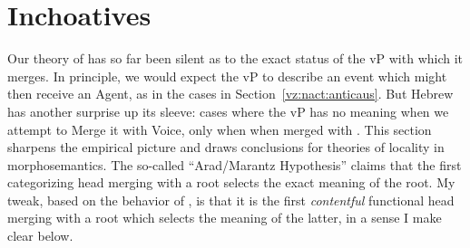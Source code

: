{%
%


\section{Inchoatives} \label{vz:inch}
Our theory of {\vz} has so far been silent as to the exact status of the vP with which it merges. In principle, we would expect the vP to describe an event which might then receive an Agent, as in the cases in Section~\ref{vz:nact:anticaus}. But Hebrew has another surprise up its sleeve: cases where the vP has no meaning when we attempt to Merge it with Voice, only when when merged with {\vz}. This section sharpens the empirical picture and draws conclusions for theories of locality in morphosemantics. The so-called ``Arad/Marantz Hypothesis'' claims that the first categorizing head merging with a root selects the exact meaning of the root. My tweak, based on the behavior of {\vz}, is that it is the first \emph{contentful} functional head merging with a root which selects the meaning of the latter, in a sense I make clear below.

}

